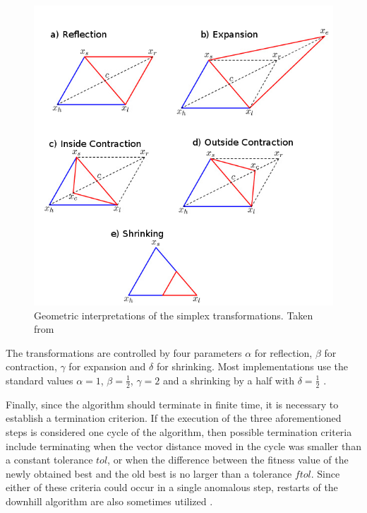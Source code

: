 \documentclass[11pt,a4paper]{report}
\begin{document}
%
\begin{figure}[H]
\begin{centering}
\includegraphics[scale=0.55]{images/amoeba}
\par\end{centering}

\caption{Geometric interpretations of the simplex transformations. Taken from
\cite{Nelder2009}}
\label{fg:amoeba}

\end{figure}


The transformations are controlled by four parameters $\alpha$ for
reflection, $\beta$ for contraction, $\gamma$ for expansion and
$\delta$ for shrinking. Most implementations use the standard values
$\alpha=1$, $\beta=\frac{1}{2}$, $\gamma=2$ and a shrinking by
a half with $\delta=\frac{1}{2}$ \cite{Press1992,Nelder2009}. 

Finally, since the algorithm should terminate in finite time, it is
necessary to establish a termination criterion. If the execution of
the three aforementioned steps is considered one cycle of the algorithm,
then possible termination criteria include terminating when the vector
distance moved in the cycle was smaller than a constant tolerance
$tol$, or when the difference between the fitness value of the newly
obtained best and the old best is no larger than a tolerance $ftol$.
Since either of these criteria could occur in a single anomalous step,
restarts of the downhill algorithm are also sometimes utilized \cite{Press1992}. 
\end{document}
